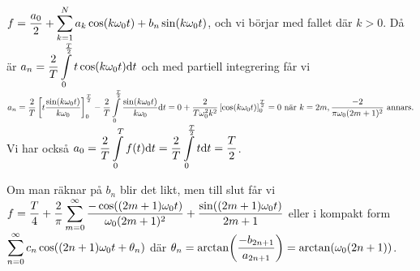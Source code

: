 \documentclass[a4paper]{article}
\begin{document}
\begin{ex}
    \f

    \(
        f = \displaystyle\frac{a_0}{2} + \displaystyle\sum_{k=1}^N a_k \cos(k \omega_0 t) + b_n \sin(k \omega_0 t)
    \), och vi börjar med fallet där \(
        k > 0
    \). Då är \(
        a_n = \displaystyle\frac{2}{T} \displaystyle\int\limits_0^{\frac{T}{2}} t \cos(k \omega_0 t) \dd t
    \) och med partiell integrering får vi \(
        a_n = \displaystyle\frac{2}{T} \left[t \displaystyle\frac{\sin(k \omega_0 t)}{k\omega_0 }  \right]_0^{\frac{T}{2}} - \displaystyle\frac{2}{T}  \displaystyle\int\limits_0^{\frac{T}{2}} \displaystyle\frac{\sin(k \omega_0 t)}{k \omega_0} \dd t
        = 0 + \displaystyle\frac{2}{T\omega_0^2k^2}\left[\cos(k\omega_0 t)\right]_0^{\frac{T}{2}} 
        = 0 \text{ när } k = 2m, \displaystyle\frac{-2}{\pi \omega_0(2m+1)^2} \text{ annars.}  
    \) Vi har också \(
        a_0 = \displaystyle\frac{2}{T} \displaystyle\int\limits_0^T f(t) \dd t = \displaystyle\frac{2}{T} \displaystyle\int\limits_0^{\frac{T}{2}} t \dd t = \displaystyle\frac{T}{2} 
    \).

    Om man räknar på \(
        b_n
    \) blir det likt, men till slut får vi \(
        f = \displaystyle\frac{T}{4} + \displaystyle\frac{2}{\pi} \displaystyle\sum_{m=0}^\infty \displaystyle\frac{-\cos((2m+1)\omega_0 t)}{\omega_0(2m+1)^2} + \displaystyle\frac{\sin((2m+1)\omega_0 t)}{2m+1}
    \) eller i kompakt form \(
        \displaystyle\sum_{n=0}^\infty c_n \cos((2n+1) \omega_0 t +\theta_n)
    \) där \(
        \theta_n = \arctan(\displaystyle\frac{-b_{2n+1}}{a_{2n+1}}) = \arctan(\omega_0(2n+1))
    \).
\end{ex}
\end{document}
